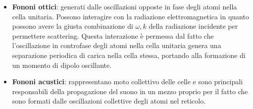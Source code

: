 \documentclass[10pt, a4paper]{scrartcl}
\numberwithin{equation}{subsection}
\theoremstyle{style1}
\theoremstyle{style2}
\begin{document}
\begin{itemize}
	\item \textbf{Fononi ottici}: generati dalle oscillazioni opposte in fase degli atomi nella cella unitaria. Possono interagire con la radiazione elettromagnetica in quanto possono avere la giusta combinazione di $\omega, k$ della radiazione incidente per permettere scattering. Questa interazione \`e permessa dal fatto che l'oscillazione in controfase degli atomi nella cella unitaria genera una separazione periodica di carica nella cella stessa, portando alla formazione di un momento di dipolo oscillante.
	\item \textbf{Fononi acustici}: rappresentano moto collettivo delle celle e sono principali responsabili della propagazione del suono in un mezzo proprio per il fatto che sono formati dalle oscillazioni collettive degli atomi nel reticolo.
\end{itemize}
\end{document}
